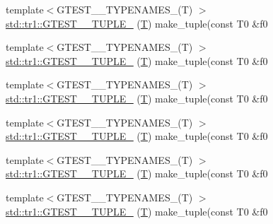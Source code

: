\begin{DoxyCompactItemize}
\item 
{\footnotesize template$<$G\+T\+E\+S\+T\+\_\+\_\+\+T\+Y\+P\+E\+N\+A\+M\+E\+S\+\_\+(\+T) $>$ }\\\hyperlink{namespacestd_1_1tr1_a6f8af2da768a7ea1e48b2700d1288166}{std\+::tr1\+::\+G\+T\+E\+S\+T\+\_\+\_\+\+T\+U\+P\+L\+E\+\_\+} (\hyperlink{functions__7_8js_adf1f3edb9115acb0a1e04209b7a9937b}{T}) make\+\_\+tuple(const T0 \&f0
\item 
{\footnotesize template$<$G\+T\+E\+S\+T\+\_\+\_\+\+T\+Y\+P\+E\+N\+A\+M\+E\+S\+\_\+(\+T) $>$ }\\\hyperlink{namespacestd_1_1tr1_a31cde155977a4544af2b44b51ffe69ac}{std\+::tr1\+::\+G\+T\+E\+S\+T\+\_\+\_\+\+T\+U\+P\+L\+E\+\_\+} (\hyperlink{functions__7_8js_adf1f3edb9115acb0a1e04209b7a9937b}{T}) make\+\_\+tuple(const T0 \&f0
\item 
{\footnotesize template$<$G\+T\+E\+S\+T\+\_\+\_\+\+T\+Y\+P\+E\+N\+A\+M\+E\+S\+\_\+(\+T) $>$ }\\\hyperlink{namespacestd_1_1tr1_a61277f5af24b20fce87a9fd94307ab34}{std\+::tr1\+::\+G\+T\+E\+S\+T\+\_\+\_\+\+T\+U\+P\+L\+E\+\_\+} (\hyperlink{functions__7_8js_adf1f3edb9115acb0a1e04209b7a9937b}{T}) make\+\_\+tuple(const T0 \&f0
\item 
{\footnotesize template$<$G\+T\+E\+S\+T\+\_\+\_\+\+T\+Y\+P\+E\+N\+A\+M\+E\+S\+\_\+(\+T) $>$ }\\\hyperlink{namespacestd_1_1tr1_a29c8efcb79a4749e079b704c418266e6}{std\+::tr1\+::\+G\+T\+E\+S\+T\+\_\+\_\+\+T\+U\+P\+L\+E\+\_\+} (\hyperlink{functions__7_8js_adf1f3edb9115acb0a1e04209b7a9937b}{T}) make\+\_\+tuple(const T0 \&f0
\item 
{\footnotesize template$<$G\+T\+E\+S\+T\+\_\+\_\+\+T\+Y\+P\+E\+N\+A\+M\+E\+S\+\_\+(\+T) $>$ }\\\hyperlink{namespacestd_1_1tr1_a6afad1f98814ccc897d0b02bc6fc4e7d}{std\+::tr1\+::\+G\+T\+E\+S\+T\+\_\+\_\+\+T\+U\+P\+L\+E\+\_\+} (\hyperlink{functions__7_8js_adf1f3edb9115acb0a1e04209b7a9937b}{T}) make\+\_\+tuple(const T0 \&f0
\item 
{\footnotesize template$<$G\+T\+E\+S\+T\+\_\+\_\+\+T\+Y\+P\+E\+N\+A\+M\+E\+S\+\_\+(\+T) $>$ }\\\hyperlink{namespacestd_1_1tr1_aa636d3269bf1f368a7bc09ff158bc482}{std\+::tr1\+::\+G\+T\+E\+S\+T\+\_\+\_\+\+T\+U\+P\+L\+E\+\_\+} (\hyperlink{functions__7_8js_adf1f3edb9115acb0a1e04209b7a9937b}{T}) make\+\_\+tuple(const T0 \&f0
\item 

\end{DoxyCompactItemize}
